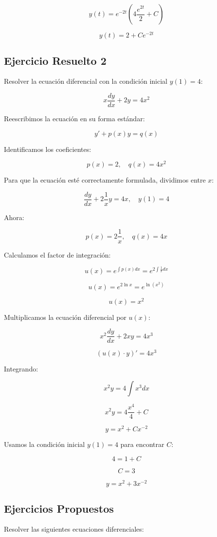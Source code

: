 \[
y(t) = e^{-2t} \left( 4\frac{e^{2t}}{2} +C\right)
\]

\[
y(t) = 2 + Ce^{-2t}
\]


\subsection{Ejercicio Resuelto  2}

Resolver la ecuación diferencial con la condición inicial \( y(1) = 4 \):

\[
x\frac{dy}{dx} + 2y = 4x^{2}
\]

Reescribimos la ecuación en su forma estándar:

\[
y' + p(x) y = q(x)
\]

Identificamos los coeficientes:

\[
p(x) = 2, \quad q(x) = 4x^2
\]

Para que la ecuación esté correctamente formulada, dividimos entre \( x \):

\[
\frac{dy}{dx} + 2\frac{1}{x} y = 4x, \quad y(1) = 4
\]

Ahora:

\[
p(x) = 2\frac{1}{x}, \quad q(x) = 4x
\]

Calculamos el factor de integración:

\[
u(x) = e^{\int p(x) dx} = e^{2\int \frac{1}{x} dx}
\]

\[
u(x) = e^{2\ln x} = e^{\ln(x^2)}
\]

\[
u(x) = x^2
\]

Multiplicamos la ecuación diferencial por \( u(x) \):

\[
x^{2} \frac{dy}{dx} + 2xy = 4x^{3}
\]

\[
(u(x) \cdot y)' = 4x^{3}
\]

Integrando:

\[
x^{2} y = 4\int x^{3} dx
\]

\[
x^{2} y = 4\frac{x^{4}}{4} +C
\]

\[
y = x^{2} + Cx^{-2}
\]

Usamos la condición inicial \( y(1) = 4 \) para encontrar \( C \):

\[
4 = 1 + C
\]

\[
C = 3
\]

\[
y = x^{2} + 3x^{-2}
\]


\subsection{Ejercicios Propuestos}

Resolver las siguientes ecuaciones diferenciales:

